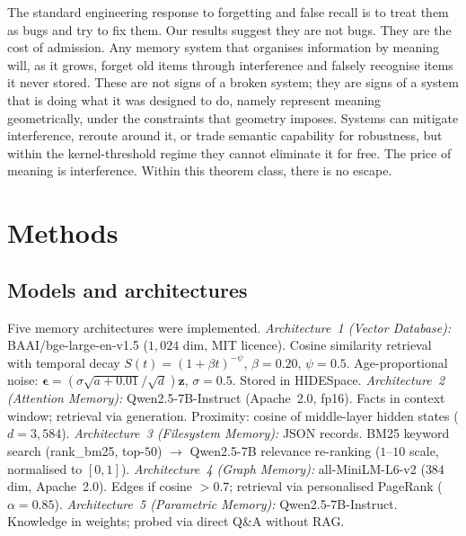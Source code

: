 \documentclass[11pt]{article}
\begin{document}
The standard engineering response to forgetting and false recall is to treat them as bugs and try to fix them. Our results suggest they are not bugs. They are the cost of admission. Any memory system that organises information by meaning will, as it grows, forget old items through interference and falsely recognise items it never stored. These are not signs of a broken system; they are signs of a system that is doing what it was designed to do, namely represent meaning geometrically, under the constraints that geometry imposes. Systems can mitigate interference, reroute around it, or trade semantic capability for robustness, but within the kernel-threshold regime they cannot eliminate it for free. The price of meaning is interference. Within this theorem class, there is no escape.

\section*{Methods}

\subsection*{Models and architectures}

Five memory architectures were implemented. \textit{Architecture~1 (Vector Database):} BAAI/bge-large-en-v1.5\cite{xiao2023} ($1{,}024$ dim, MIT licence). Cosine similarity retrieval with temporal decay $S(t) = (1 + \beta t)^{-\psi}$, $\beta = 0.20$, $\psi = 0.5$. Age-proportional noise: $\boldsymbol{\epsilon} = (\sigma\sqrt{a + 0.01}/\sqrt{d})\mathbf{z}$, $\sigma = 0.5$. Stored in HIDESpace\cite{gopinath2025}. \textit{Architecture~2 (Attention Memory):} Qwen2.5-7B-Instruct\cite{qwen2024} (Apache~2.0, fp16). Facts in context window; retrieval via generation. Proximity: cosine of middle-layer hidden states ($d = 3{,}584$). \textit{Architecture~3 (Filesystem Memory):} JSON records. BM25 keyword search (rank\_bm25, top-$50$) $\to$ Qwen2.5-7B relevance re-ranking ($1$--$10$ scale, normalised to $[0,1]$). \textit{Architecture~4 (Graph Memory):} all-MiniLM-L6-v2\cite{reimers2019} ($384$ dim, Apache~2.0). Edges if cosine $> 0.7$; retrieval via personalised PageRank ($\alpha = 0.85$). \textit{Architecture~5 (Parametric Memory):} Qwen2.5-7B-Instruct. Knowledge in weights; probed via direct Q\&A without RAG.
\end{document}
